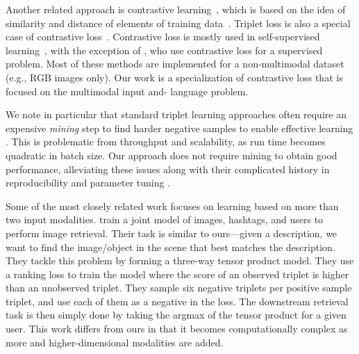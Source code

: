 \documentclass[sigconf,natbib=true,anonymous=true]{acmart}
\begin{document}
Another related approach is contrastive learning~\cite{qin2021world}, which is based on the idea of similarity and distance of elements of training data~\cite{NEURIPS2020_supervised_contrastive,chen2020simple}. Triplet loss is also a special case of contrastive loss~\cite{NEURIPS2020_supervised_contrastive}. Contrastive loss is mostly used in self-supervised learning~\cite{bui2021self, alayrac2020self,chen2020simple}, with the exception of \citet{NEURIPS2020_supervised_contrastive}, who use contrastive loss for a supervised problem. Most of these methods are implemented for a non-multimodal dataset (e.g., RGB images only). Our work is a specialization of contrastive loss that is focused on the multimodal input and- language problem.

We note in particular that standard triplet learning approaches often require an expensive \textit{mining} step to find harder negative samples to enable effective learning \cite{Hoffer2015,Schroff2015,DBLP:conf/eccv/2018-9,DBLP:conf/eccv/ZhaoJQLH18,Zhai2018}. This is problematic from throughput and scalability, as run time becomes quadratic in batch size. Our approach does not require mining to obtain good performance, alleviating these issues along with their complicated history in reproducibility and parameter tuning \cite{Musgrave2020,Raff2020c,Raff2019_quantify_repro}. 

Some of the most closely related work focuses on learning based on more than two input modalities. \citet{Veit_2018_CVPR} train a joint model of images, hashtags, and users to perform image retrieval. Their task is similar to ours---given a description, we want to find the image/object in the scene that best matches the description. They tackle this problem by forming a three-way tensor product model. They use a ranking loss to train the model where the score of an observed triplet is higher than an unobserved triplet. They sample six negative triplets per positive sample triplet, and use each of them as a negative in the loss. The downstream retrieval task is then simply done by taking the argmax of the tensor product for a given user. This work differs from ours in that it becomes computationally complex as more and higher-dimensional modalities are added.
\end{document}
